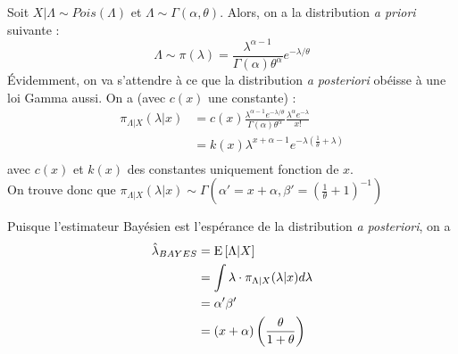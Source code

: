 \documentclass[12pt, french]{report}
\begin{document}
\begin{exemple}
Soit $X | \Lambda \sim Pois(\Lambda)$ et $\Lambda \sim \Gamma(\alpha, \theta)$. Alors, on a la distribution \emph{a priori} suivante : 
\[\Lambda \sim \pi(\lambda) = \frac{\lambda^{\alpha -1}}{\Gamma(\alpha) \theta^\alpha} e^{-\lambda / \theta} \] 
Évidemment, on va s'attendre à ce que la distribution \emph{a posteriori} obéisse à une loi Gamma aussi. On a (avec $c(x)$ une constante) : 
\begin{align*}
\pi_{\Lambda | X}( \lambda | x) &  =c(x) \frac{\lambda^{\alpha -1} e^{-\lambda / \theta}}{\Gamma(\alpha) \theta^{\alpha}} \frac{\lambda^{\alpha} e^{-\lambda}}{x!} \\
& = k(x) \lambda^{x + \alpha - 1} e^{-\lambda\left( \frac{1}{\theta} + \lambda \right)} \\
\end{align*}
avec $c(x)$ et $k(x)$ des constantes uniquement fonction de $x$. \\

On trouve donc que $\pi_{\Lambda | X}( \lambda | x)  \sim \Gamma\left( \alpha' = x + \alpha, \beta' = \left(\frac{1}{\theta} + 1 \right)^{-1} \right)$

Puisque l'estimateur Bayésien est l'espérance de la distribution \emph{a posteriori}, on a
\begin{align*}
\hat{\lambda}_{BAYES} & = \mathrm{E} \left[ \Lambda | X \right] \\
& = \int \lambda \cdot \pi_{\Lambda | X}( \lambda | x) d \lambda \\
& = \alpha' \beta' \\
& = (x + \alpha) \left( \frac{\theta}{1 + \theta} \right) \\
\end{align*}
\end{exemple}
\end{document}
